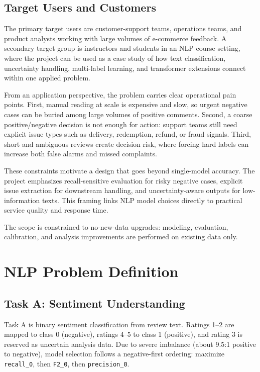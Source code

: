 \documentclass[12pt,a4paper]{article}
\begin{document}
\subsection{Target Users and Customers}
The primary target users are customer-support teams, operations teams, and product analysts working with large volumes of e-commerce feedback. A secondary target group is instructors and students in an NLP course setting, where the project can be used as a case study of how text classification, uncertainty handling, multi-label learning, and transformer extensions connect within one applied problem.

From an application perspective, the problem carries clear operational pain points. First, manual reading at scale is expensive and slow, so urgent negative cases can be buried among large volumes of positive comments. Second, a coarse positive/negative decision is not enough for action: support teams still need explicit issue types such as delivery, redemption, refund, or fraud signals. Third, short and ambiguous reviews create decision risk, where forcing hard labels can increase both false alarms and missed complaints.

These constraints motivate a design that goes beyond single-model accuracy. The project emphasizes recall-sensitive evaluation for risky negative cases, explicit issue extraction for downstream handling, and uncertainty-aware outputs for low-information texts. This framing links NLP model choices directly to practical service quality and response time.

The scope is constrained to no-new-data upgrades: modeling, evaluation, calibration, and analysis improvements are performed on existing data only.

\section{NLP Problem Definition}
\subsection{Task A: Sentiment Understanding}
Task A is binary sentiment classification from review text. Ratings 1--2 are mapped to class 0 (negative), ratings 4--5 to class 1 (positive), and rating 3 is reserved as uncertain analysis data. Due to severe imbalance (about 9.5:1 positive to negative), model selection follows a negative-first ordering: maximize \texttt{recall\_0}, then \texttt{F2\_0}, then \texttt{precision\_0}.
\end{document}
